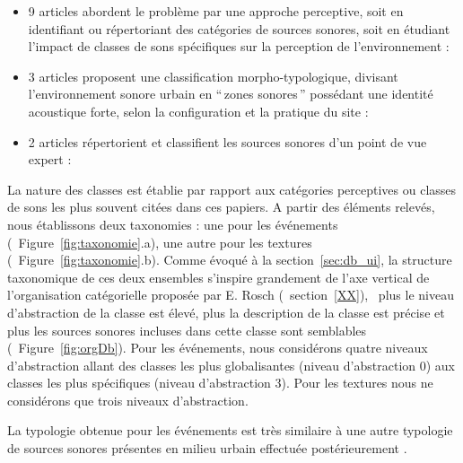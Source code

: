 \begin{itemize}
\item 9 articles abordent le problème par une approche perceptive, soit en identifiant ou répertoriant des catégories de sources sonores, soit en étudiant l'impact de classes de sons spécifiques sur la perception de l'environnement : \cite{maffiolo_caracterisation_1999,raimbault2002simulation,guastavino_etude_2003,defreville2004aactivity,raimbault2005urban,dubois2006cognitive,devergie_relations_2006,guastavino2006ideal,niessen2010categories}
\item 3 articles proposent une classification morpho-typologique, divisant l’environnement sonore urbain en ``\,zones sonores\,'' possédant une identité acoustique forte, selon la configuration et la pratique du site : \cite{maffiolo_caracterisation_1999,beaumont2004pertinence,polack2008perceptive}
\item 2 articles répertorient et classifient les sources sonores d’un point de vue expert : \cite{leobon_analyse_1986,brown2011towards}
\end{itemize}

La nature des classes est établie par rapport aux catégories perceptives ou classes de sons les plus souvent citées dans ces papiers. A  partir des éléments relevés, nous établissons deux taxonomies : une pour les événements (\cf~Figure~\ref{fig:taxonomie}.a), une autre pour les textures (\cf~Figure~\ref{fig:taxonomie}.b). Comme évoqué à la section~\ref{sec:db_ui}, la structure taxonomique de ces deux ensembles s'inspire grandement de l'axe vertical de l'organisation catégorielle  proposée  par E. Rosch (\Cf~section~\ref{XX}), \ie~plus le niveau d'abstraction de la classe est élevé, plus la description de la classe est précise et plus les sources sonores incluses dans cette classe sont semblables (\Cf~Figure~\ref{fig:orgDb}). Pour les événements, nous considérons quatre niveaux d'abstraction allant des classes les plus globalisantes (niveau d'abstraction 0) aux classes les plus spécifiques (niveau d'abstraction 3). Pour les textures nous ne considérons que trois niveaux d'abstraction.

La typologie obtenue pour les événements est très similaire à une autre  typologie de sources sonores présentes en milieu urbain effectuée postérieurement \citep{Salamon14}. \\

